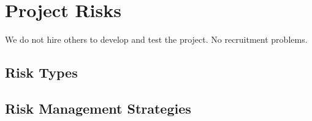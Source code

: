 \section{Project Risks}
We do not hire others to develop and test the project.
No recruitment problems.
\subsection{Risk Types}
\subsection{Risk Management Strategies}
%
